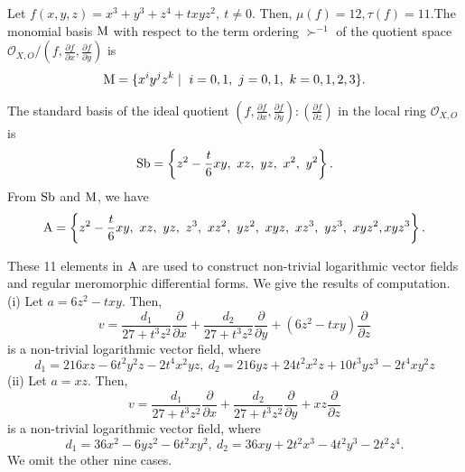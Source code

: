 \documentclass[pdftex]{arxsigma}
\begin{document}
\begin{example}

 Let $ f(x,y,z) = x^3+y^3+z^4+txyz^2, \ t\ne 0. $ Then, $ \mu(f)=12, \tau(f)=11. $The monomial basis ${\rm M} $ with respect to the term ordering $ \succ^{-1} $ of the quotient space 
$ {\mathcal O}_{X,O}/(f, \frac{\partial f}{\partial x}, \frac{\partial f}{\partial y}) $ is 
\begin{equation*}
{\rm M} = \{ x^i y^j z^k \mid \  i=0,1, \ j=0,1, \ k=0,1,2,3 \}. 
\end{equation*}

The standard basis of the ideal quotient $ (f, \frac{\partial f}{\partial x}, \frac{\partial f}{\partial y}) : (\frac{\partial f}{\partial z}) $ 
in the local ring $ {\mathcal O}_{X,O} $ is 
\begin{equation*}
{\rm Sb} = \left\{ z^2-\dfrac{t}{6}xy, \ xz, \ yz, \ x^2, \ y^2 \right\}. 
\end{equation*}
From $ {\rm Sb} $ and $ {\rm M} $, we have 
\begin{equation*}
{\rm A} =\left\{ z^2-\dfrac{t}{6}xy, \ xz, \ yz, \ z^3, \ xz^2, \ yz^2, \ xyz, \ xz^3, \ yz^3, \ xyz^2, xyz^3 \right\}. 
\end{equation*}

These 11 elements in $ {\rm A} $ are used to construct non-trivial logarithmic vector fields and regular meromorphic differential forms.
We give the results of computation.\\
\noindent
(i) Let $ a=6z^2-txy. $ Then, 
\begin{equation*}
v=\frac{d_1}{27+t^3z^2}\frac{\partial}{\partial x} +\frac{d_2}{27+t^3z^2}\frac{\partial}{\partial y} +(6z^2-txy)\frac{\partial}{\partial z} 
\end{equation*}
is a non-trivial logarithmic vector field, where
\begin{equation*}
d_1= 216xz-6t^2y^2z-2t^4x^2yz, \ d_2=216yz+24t^2x^2z+10t^3yz^3-2t^4xy^2z 
\end{equation*}
\noindent
(ii) Let $ a=xz. $ Then, 
\begin{equation*}
v=\frac{d_1}{27+t^3z^2}\frac{\partial}{\partial x} +\frac{d_2}{27+t^3z^2}\frac{\partial}{\partial y} +xz\frac{\partial}{\partial z} 
\end{equation*}
is a non-trivial logarithmic vector field, where
\begin{equation*}
d_1=36x^2-6yz^2-6t^2xy^2, \ d_2=36xy+2t^2x^3-4t^2y^3-2t^2z^4. 
\end{equation*}
We omit the other nine cases. 
\end{example}
\end{document}
